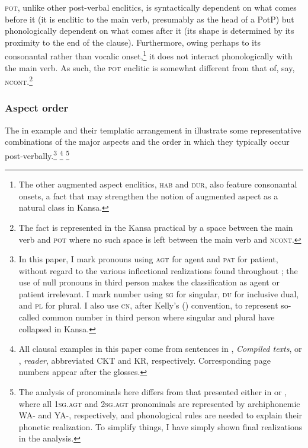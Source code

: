 \documentclass[output=paper]{LSP/langsci}
\begin{document}
\textsc{pot}, unlike other post-verbal enclitics, is syntactically dependent on what comes before it (it is enclitic to the main verb, presumably as the head of a PotP) but phonologically dependent on what comes after it (its shape is determined by its proximity to the end of the clause). Furthermore, owing perhaps to its consonantal rather than vocalic onset,\footnote{The other augmented aspect enclitics, \textsc{hab} and \textsc{dur}, also feature consonantal onsets, a fact that may strengthen the notion of augmented aspect as a natural class in Kansa.} it does not interact phonologically with the main verb. As such, the \textsc{pot} enclitic is somewhat different from that of, say, \textsc{ncont}.\footnote{The fact is represented in the Kansa practical  by a space between the main verb and \textsc{pot} where no such space is left between the main verb and \textsc{ncont}.}

\subsubsection{Aspect order} 
 
The  in example  and their templatic arrangement in  illustrate some representative combinations of the major aspects and the order in which they typically occur post-verbally.\footnote{In this paper, I mark pronouns using \textsc{agt} for agent and \textsc{pat} for patient, without regard to the various inflectional realizations found throughout ; the use of null pronouns in third person makes the classification as agent or patient irrelevant. I mark number using \textsc{sg} for singular, \textsc{du} for inclusive dual, and \textsc{pl} for plural. I also use \textsc{cn}, after Kelly's (\citeyear{Kelly1992})   convention, to represent so-called common number in third person where singular and plural have collapsed in Kansa.} \footnote{All clausal examples in this paper come from sentences in  \citet{McBrideCumberland2009}, \textit{Compiled  texts}, or \citet{McBrideCumberland2010}, \textit{ reader}, abbreviated CKT and KR, respectively. Corresponding page numbers appear after the  glosses.} \footnote{The analysis of pronominals here differs from that presented either in \citet{Quintero2004} or \citet{Rankin2005b}, where all \textsc{1sg.agt} and \textsc{2sg.agt} pronominals are represented by archiphonemic WA- and YA-, respectively, and phonological rules are needed to explain their phonetic realization. To simplify things, I have simply shown final realizations in the analysis.}
 
\end{document}

